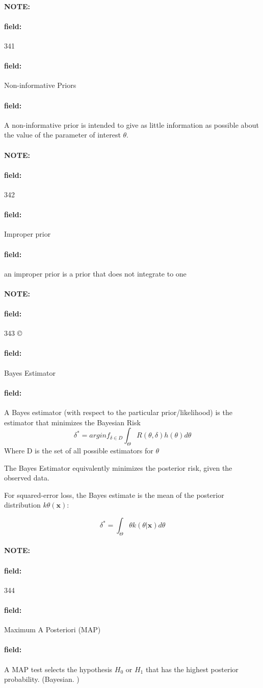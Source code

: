 \documentclass[12pt]{article}
\newenvironment{note}{\paragraph{NOTE:}}{}
\newenvironment{field}{\paragraph{field:}}{}
\begin{document}
\begin{note}
    \begin{field}
        \tiny 341
    \end{field}
    \begin{field}
        Non-informative Priors
    \end{field}
    \begin{field}
        A non-informative prior is intended to give as little information as possible about the value of the parameter of interest $\theta$.
    \end{field}
\end{note}


\begin{note}
    \begin{field}
        \tiny 342
    \end{field}
    \begin{field}
        Improper prior
    \end{field}
    \begin{field}
        an improper prior is a prior that does not integrate to one
    \end{field}
\end{note}


\begin{note}
    \begin{field}
        \tiny 343
    \end{field}©
    \begin{field}
        Bayes Estimator
    \end{field}
    \begin{field}
        A Bayes estimator (with respect to the particular prior/likelihood) is the estimator that minimizes the Bayesian Risk
        $$\delta^* = arg inf_{\delta \in D} \int_\Theta R(\theta,\delta)h(\theta)d\theta $$
        Where D is the set of all possible estimators for $\theta$

        The Bayes Estimator equivalently minimizes the posterior risk, given the observed data.

        For squared-error loss, the Bayes estimate is the mean of the posterior distribution $k\theta(\mathbf{x})$:

        $$\delta^* = \int_\Theta \theta k(\theta|\mathbf{x})d\theta $$
    \end{field}
\end{note}

\begin{note}
    \begin{field}
        \tiny 344
    \end{field}
    \begin{field}
        Maximum A Posteriori (MAP)
    \end{field}
    \begin{field}
        A MAP test selects the hypothesis $H_0$ or $H_1$ that has the highest posterior probability. (Bayesian. )
    \end{field}
\end{note}
\end{document}
